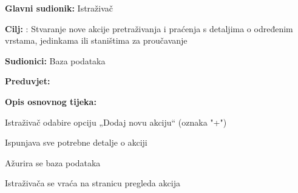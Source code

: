 					\noindent {}
					\begin{packed_item}
	
						\item \textbf{Glavni sudionik: } Istraživač
						\item  \textbf{Cilj:} : Stvaranje nove akcije pretraživanja i praćenja s detaljima o određenim vrstama, jedinkama ili staništima za proučavanje
						\item  \textbf{Sudionici:} Baza podataka
						\item  \textbf{Preduvjet:} 
						\item  \textbf{Opis osnovnog tijeka:}
						
						\item[] \begin{packed_enum}
	
							\item Istraživač odabire opciju „Dodaj novu akciju“ (oznaka "+")
							\item Ispunjava sve potrebne detalje o akciji
							\item Ažurira se baza podataka
							\item Istraživača se vraća na stranicu pregleda akcija
							
						\end{packed_enum}
					\end{packed_item}
					\noindent {}
